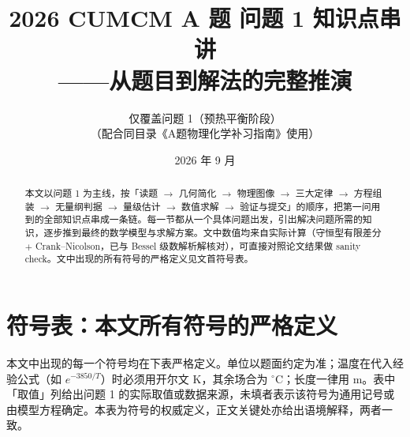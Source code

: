 \documentclass[12pt,a4paper]{ctexart}
\title{\bfseries 2026 CUMCM A 题 问题 1 知识点串讲\\——从题目到解法的完整推演}
\author{仅覆盖问题 1（预热平衡阶段）\\（配合同目录《A题物理化学补习指南》使用）}
\date{2026 年 9 月}
\begin{document}
\maketitle

\begin{abstract}
本文以问题 1 为主线，按「读题 $\to$ 几何简化 $\to$ 物理图像 $\to$ 三大定律 $\to$ 方程组装 $\to$ 无量纲判据 $\to$ 量级估计 $\to$ 数值求解 $\to$ 验证与提交」的顺序，把第一问用到的全部知识点串成一条链。每一节都从一个具体问题出发，引出解决问题所需的知识，逐步推到最终的数学模型与求解方案。文中数值均来自实际计算（守恒型有限差分 $+$ Crank--Nicolson，已与 Bessel 级数解析解核对），可直接对照论文结果做 sanity check。文中出现的所有符号的严格定义见文首符号表。
\end{abstract}

\tableofcontents
\newpage

\section*{符号表：本文所有符号的严格定义}

本文中出现的每一个符号均在下表严格定义。单位以题面约定为准；温度在代入经验公式（如 $e^{-3850/T}$）时必须用开尔文 K，其余场合为 $^\circ$C；长度一律用 m。表中「取值」列给出问题 1 的实际取值或数据来源，未填者表示该符号为通用记号或由模型方程确定。本表为符号的权威定义，正文关键处亦给出语境解释，两者一致。
\end{document}

